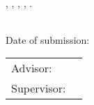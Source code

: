 
\thispagestyle{empty}

\ \vfill

\noindent%
\myName{}, \emph{\myTitle{}}, \myDegree, \myUni{}, \myYearPublication{}.

\bigskip

\noindent\myThesiscode{} \\
Date of submission: \myTime{}

\bigskip

\noindent\begin{tabular}{@{}l@{~}l@{}}
Advisor: & \myProf{} \\
Supervisor: & \mySupervisor{} \\
\end{tabular}

\bigskip

\noindent%
\myDepartment{} \\
\myFaculty{} \\
\myUni{}








